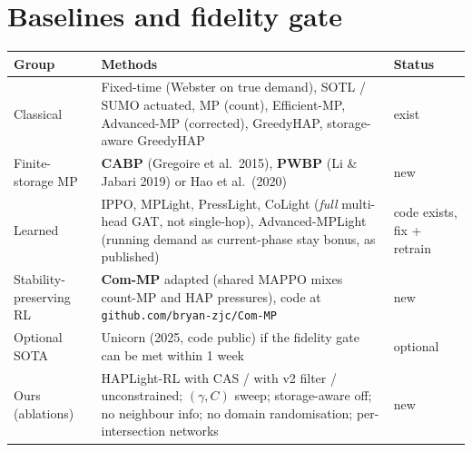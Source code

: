 \documentclass[11pt,a4paper]{article}
\begin{document}
\section{Baselines and fidelity gate}
\label{sec:baselines}
\small
\begin{tabularx}{\textwidth}{@{}lXl@{}}
\toprule
Group & Methods & Status \\
\midrule
Classical & Fixed-time (Webster on true demand), SOTL / SUMO actuated, MP (count),
  Efficient-MP, Advanced-MP (corrected), GreedyHAP, storage-aware GreedyHAP & exist \\
Finite-storage MP & \textbf{CABP} (Gregoire et al.\ 2015), \textbf{PWBP} (Li \& Jabari
  2019) or Hao et al.\ (2020) & new \\
Learned & IPPO, MPLight, PressLight, CoLight (\emph{full} multi-head GAT, not single-hop),
  Advanced-MPLight (running demand as current-phase stay bonus, as published) & code exists,
  fix + retrain \\
Stability-preserving RL & \textbf{Com-MP} adapted (shared MAPPO mixes count-MP and HAP
  pressures), code at \texttt{github.com/bryan-zjc/Com-MP} & new \\
Optional SOTA & Unicorn (2025, code public) if the fidelity gate can be met within 1 week & optional \\
Ours (ablations) & HAPLight-RL with CAS / with v2 filter / unconstrained; $(\gamma,C)$
  sweep; storage-aware off; no neighbour info; no domain randomisation; per-intersection
  networks & new \\
\bottomrule
\end{tabularx}
\normalsize
\end{document}
